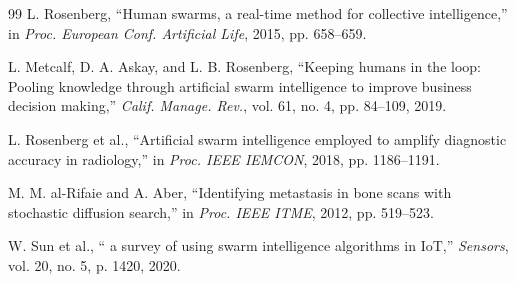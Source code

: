\documentclass[letterpaper, 10pt, conference]{IEEEtran}
\begin{document}
\begin{thebibliography}{99}
L. Rosenberg, ``Human swarms, a real-time method for collective intelligence,'' in \emph{Proc. European Conf. Artificial Life}, 2015, pp. 658--659.

L. Metcalf, D. A. Askay, and L. B. Rosenberg, ``Keeping humans in the loop: Pooling knowledge through artificial swarm intelligence to improve business decision making,'' \emph{Calif. Manage. Rev.}, vol. 61, no. 4, pp. 84--109, 2019.

L. Rosenberg et al., ``Artificial swarm intelligence employed to amplify diagnostic accuracy in radiology,'' in \emph{Proc. IEEE IEMCON}, 2018, pp. 1186--1191.

M. M. al-Rifaie and A. Aber, ``Identifying metastasis in bone scans with stochastic diffusion search,'' in \emph{Proc. IEEE ITME}, 2012, pp. 519--523.

W. Sun et al., `` a survey of using swarm intelligence algorithms in {IoT},'' \emph{Sensors}, vol. 20, no. 5, p. 1420, 2020.

\end{thebibliography}
\end{document}
